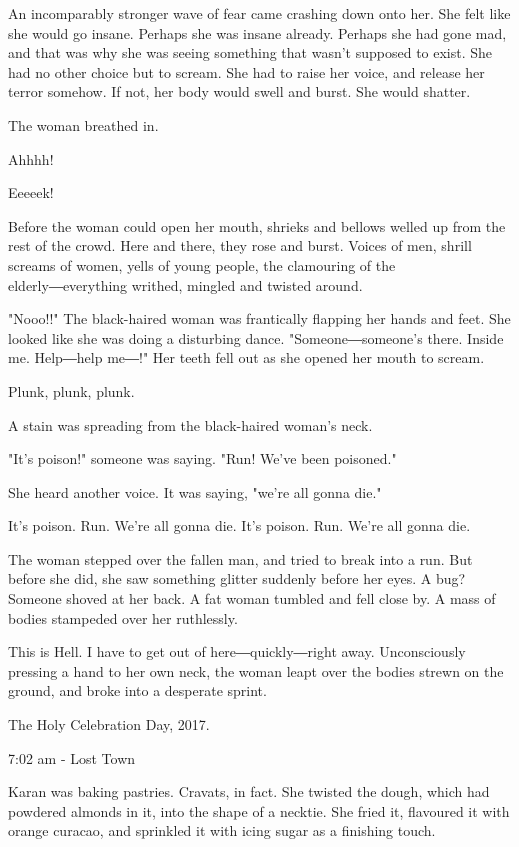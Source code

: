 An incomparably stronger wave of fear came crashing down onto her. She
felt like she would go insane. Perhaps she was insane already. Perhaps
she had gone mad, and that was why she was seeing something that wasn't
supposed to exist. She had no other choice but to scream. She had to
raise her voice, and release her terror somehow. If not, her body would
swell and burst. She would shatter.

The woman breathed in.

Ahhhh!

Eeeeek!

Before the woman could open her mouth, shrieks and bellows welled up
from the rest of the crowd. Here and there, they rose and burst. Voices
of men, shrill screams of women, yells of young people, the clamouring
of the elderly―everything writhed, mingled and twisted around.

"Nooo!!" The black-haired woman was frantically flapping her hands and
feet. She looked like she was doing a disturbing dance.
"Someone―someone's there. Inside me. Help―help me―!" Her teeth fell out
as she opened her mouth to scream.

Plunk, plunk, plunk.

A stain was spreading from the black-haired woman's neck.

"It's poison!" someone was saying. "Run! We've been poisoned."

She heard another voice. It was saying, "we're all gonna die."

It's poison. Run. We're all gonna die. It's poison. Run. We're all gonna
die.

The woman stepped over the fallen man, and tried to break into a run.
But before she did, she saw something glitter suddenly before her eyes.
A bug? Someone shoved at her back. A fat woman tumbled and fell close
by. A mass of bodies stampeded over her ruthlessly.

This is Hell. I have to get out of here―quickly―right away.
Unconsciously pressing a hand to her own neck, the woman leapt over the
bodies strewn on the ground, and broke into a desperate sprint.

The Holy Celebration Day, 2017.

7:02 am - Lost Town

Karan was baking pastries. Cravats, in fact. She twisted the dough,
which had powdered almonds in it, into the shape of a necktie. She fried
it, flavoured it with orange curacao, and sprinkled it with icing sugar
as a finishing touch.

